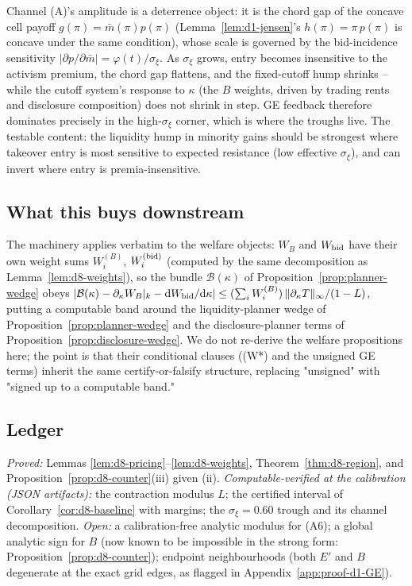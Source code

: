 \begin{remark}
\label{rem:d8-boundary}
Channel (A)'s amplitude is a deterrence object: it is the chord gap of the concave cell payoff $g(\pi)=\bar m(\pi)p(\pi)$ (Lemma~\ref{lem:d1-jensen}'s $h(\pi)=\pi\,p(\pi)$ is concave under the same condition), whose scale is governed by the bid-incidence sensitivity $|\partial p/\partial\bar m|=\varphi(t)/\sigma_\xi$. As $\sigma_\xi$ grows, entry becomes insensitive to the activism premium, the chord gap flattens, and the fixed-cutoff hump shrinks -- while the cutoff system's response to $\kappa$ (the $B$ weights, driven by trading rents and disclosure composition) does not shrink in step. GE feedback therefore dominates precisely in the high-$\sigma_\xi$ corner, which is where the troughs live. The testable content: the liquidity hump in minority gains should be strongest where takeover entry is most sensitive to expected resistance (low effective $\sigma_\xi$), and can invert where entry is premia-insensitive.
\end{remark}

\subsection{What this buys downstream}
\label{app:d8-downstream}

The machinery applies verbatim to the welfare objects: $W_B$ and $W_{\textup{bid}}$ have their own weight sums $W^{(B)}_i$, $W^{(\textup{bid})}_i$ (computed by the same decomposition as Lemma~\ref{lem:d8-weights}), so the bundle $\mathcal B(\kappa)$ of Proposition~\ref{prop:planner-wedge} obeys $|\mathcal B(\kappa)-\partial_\kappa W_B|_{k}-\mathrm{d} W_{\textup{bid}}/\mathrm{d}\kappa|\le(\sum_i W^{(B)}_i)\,\|\partial_\kappa T\|_\infty/(1-L)$, putting a computable band around the liquidity-planner wedge of Proposition~\ref{prop:planner-wedge} and the disclosure-planner terms of Proposition~\ref{prop:disclosure-wedge}. We do not re-derive the welfare propositions here; the point is that their conditional clauses (\textup{(W*)} and the unsigned GE terms) inherit the same certify-or-falsify structure, replacing "unsigned" with "signed up to a computable band."

\subsection{Ledger}
\label{app:d8-ledger}

\emph{Proved:} Lemmas \ref{lem:d8-pricing}--\ref{lem:d8-weights}, Theorem~\ref{thm:d8-region}, and Proposition~\ref{prop:d8-counter}(iii) given (ii). \emph{Computable-verified at the calibration (JSON artifacts):} the contraction modulus $L$; the certified interval of Corollary~\ref{cor:d8-baseline} with margins; the $\sigma_\xi=0.60$ trough and its channel decomposition. \emph{Open:} a calibration-free analytic modulus for \textup{(A6)}; a global analytic sign for $B$ (now known to be impossible in the strong form: Proposition~\ref{prop:d8-counter}); endpoint neighbourhoods (both $E'$ and $B$ degenerate at the exact grid edges, as flagged in Appendix~\ref{app:proof-d1-GE}).

